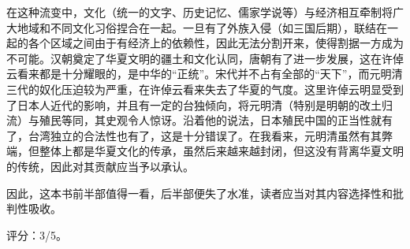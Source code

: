 在这种流变中，文化（统一的文字、历史记忆、儒家学说等）与经济相互牵制将广大地域和不同文化习俗捏合在一起。一旦有了外族入侵（如三国后期），联结在一起的各个区域之间由于有经济上的依赖性，因此无法分割开来，使得割据一方成为不可能。汉朝奠定了华夏文明的疆土和文化认同，唐朝有了进一步发展，这在许倬云看来都是十分耀眼的，是中华的“正统”。宋代并不占有全部的“天下”，而元明清三代的奴化压迫较为严重，在许倬云看来失去了华夏的气度。这里许倬云明显受到了日本人近代的影响，并且有一定的台独倾向，将元明清（特别是明朝的改土归流）与殖民等同，其史观令人惊讶。沿着他的说法，日本殖民中国的正当性就有了，台湾独立的合法性也有了，这是十分错误了。在我看来，元明清虽然有其弊端，但整体上都是华夏文化的传承，虽然后来越来越封闭，但这没有背离华夏文明的传统，因此对其贡献应当予以承认。

因此，这本书前半部值得一看，后半部便失了水准，读者应当对其内容选择性和批判性吸收。

评分：3/5。